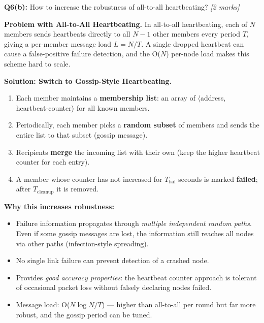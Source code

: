 \documentclass[12pt,a4paper]{article}
\begin{document}
\begin{qbox}
\textbf{Q6(b):} How to increase the robustness of all-to-all heartbeating?
\hfill \textit{[2 marks]}
\end{qbox}

\begin{solbox}
\textbf{Problem with All-to-All Heartbeating.}
In all-to-all heartbeating, each of $N$ members sends heartbeats directly to all
$N-1$ other members every period $T$, giving a per-member message load $L = N/T$.
A single dropped heartbeat can cause a false-positive failure detection, and the
O($N$) per-node load makes this scheme hard to scale.

\medskip
\textbf{Solution: Switch to Gossip-Style Heartbeating.}

\begin{enumerate}
  \item Each member maintains a \textbf{membership list}:
        an array of $\langle$address,\, heartbeat-counter$\rangle$ for all known members.
  \item Periodically, each member picks a \textbf{random subset} of members
        and sends the entire list to that subset (gossip message).
  \item Recipients \textbf{merge} the incoming list with their own
        (keep the higher heartbeat counter for each entry).
  \item A member whose counter has not increased for $T_{\text{fail}}$ seconds is marked
        \textbf{failed}; after $T_{\text{cleanup}}$ it is removed.
\end{enumerate}

\textbf{Why this increases robustness:}
\begin{itemize}
  \item Failure information propagates through \emph{multiple independent random paths}.
        Even if some gossip messages are lost, the information still reaches all nodes
        via other paths (infection-style spreading).
  \item No single link failure can prevent detection of a crashed node.
  \item Provides \emph{good accuracy properties}: the heartbeat counter approach is
        tolerant of occasional packet loss without falsely declaring nodes failed.
  \item Message load: O($N \log N / T$) — higher than all-to-all per round but
        far more robust, and the gossip period can be tuned.
\end{itemize}
\end{solbox}
\end{document}
